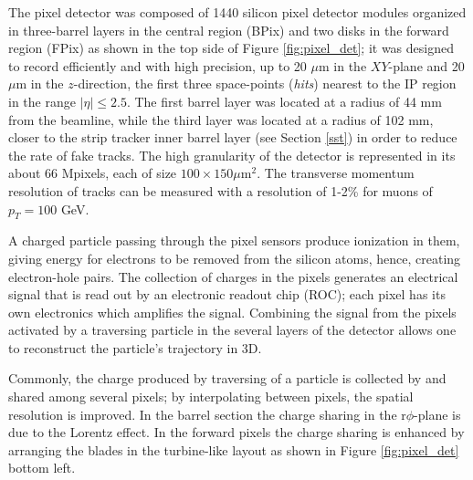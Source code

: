 The pixel detector was composed of 1440 silicon pixel detector modules organized in three-barrel layers in the central region (BPix) and two disks in the forward region (FPix) as shown in the top side of Figure \ref{fig:pixel_det}; it was designed to record efficiently and with high precision, up to 20 $\mu$m in the $XY$-plane and 20 $\mu$m in the $z$-direction, the first three space-points (\textit{hits}) nearest to the IP region in the range $|\eta|\leq 2.5$. The first barrel layer was located at a radius of 44 mm from the beamline, while the third layer was located at a radius of 102 mm, closer to the strip tracker inner barrel layer (see Section \ref{sst}) in order to reduce the rate of fake tracks. The high granularity of the detector is represented in its about 66 Mpixels, each of size $100\times150 \mu$m$^2$. The transverse momentum resolution of tracks can be measured with a resolution of 1-2\% for muons of $p_T=100$ GeV. 

A charged particle passing through the pixel sensors produce ionization in them, giving energy for electrons to be removed from the silicon atoms, hence, creating electron-hole pairs. The collection of charges in the pixels generates an electrical signal that is read out by an electronic readout chip (ROC); each pixel has its own electronics which amplifies the signal. Combining the signal from the pixels activated by a traversing particle in the several layers of the detector allows one to reconstruct the particle's trajectory in 3D.

Commonly, the charge produced by traversing of a particle is collected by and shared among several pixels; by interpolating between pixels, the spatial resolution is improved. In the barrel section the charge sharing in the r$\phi$-plane is due to the Lorentz effect. In the forward pixels the charge sharing is enhanced by arranging the blades in the turbine-like layout as shown in Figure \ref{fig:pixel_det} bottom left.


